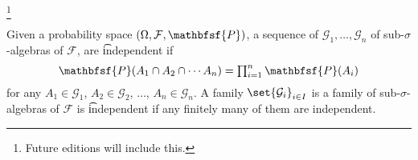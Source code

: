 
  \ifhmode\unskip\fi\footnote{
Future editions will include this.
  }


Given a probability space $(\Omega , \mathcal{F} , \mathbfsf{P} )$, a sequence of $\mathcal{G} _1, \dots , \mathcal{G} _n$ of sub-$\sigma $-algebras of $\mathcal{F} $, are \t{independent} if
  \[
\textstyle
\mathbfsf{P} (A_1 \cap A_2 \cap \cdots A_n) = \prod_{i = 1}^{n} \mathbfsf{P} (A_i)
  \]
for any $A_1 \in \mathcal{G} _1$, $A_2 \in \mathcal{G} _2$, $\dots $, $A_n \in \mathcal{G} _n$.
A family $\set{\mathcal{G} _i}_{i \in I}$ is a family of sub-$\sigma $-algebras of $\mathcal{F} $ is \t{independent} if any finitely many of them are independent.

\blankpage
